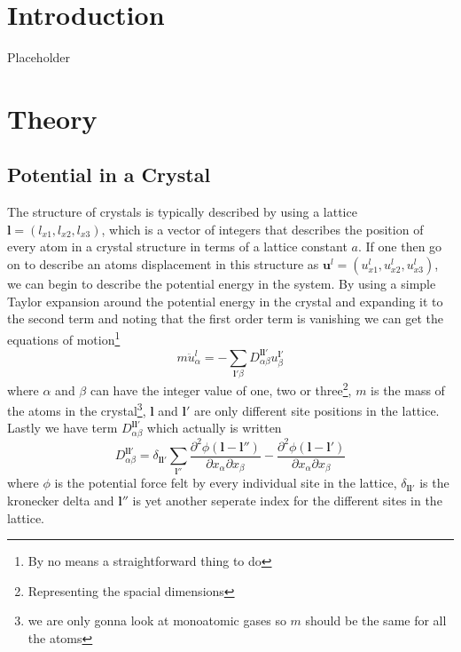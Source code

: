 \documentclass[11pt]{article}
\begin{document}
\section{Introduction}
Placeholder
\section{Theory}
\subsection{Potential in a Crystal}
The structure of crystals is typically described by using a lattice $\mathbf{l} = (l_{x1}, l_{x2}, l_{x3})$, which is a vector of integers that describes the position of every atom in a crystal structure in terms of a lattice constant $a$. If one then go on to describe an atoms displacement in this structure as $\mathbf{u}^l = (u^l_{x1},u^l_{x2},u^l_{x3})$, we can begin to describe the potential energy in the system. By using a simple Taylor expansion around the potential energy in the crystal and expanding it to the second term and noting that the first order term is vanishing we can get the equations of motion\footnote{By no means a straightforward thing to do} 
\begin{equation}
	m \ddot{u}^l_{\alpha} = - \sum_{\mathbf{l}'\beta} D^{\mathbf{l}\mathbf{l}'}_{\alpha \beta} u^{\mathbf{l}'}_{\beta}
	\label{eq:motion}
\end{equation}
where $\alpha$ and $\beta$ can have the integer value of one, two or three\footnote{Representing the spacial dimensions}, $m$ is the mass of the atoms in the crystal\footnote{we are only gonna look at monoatomic gases so $m$ should be the same for all the atoms}, $\mathbf{l}$ and $\mathbf{l}'$ are only different site positions in the lattice. Lastly we have term $D^{\mathbf{l}\mathbf{l}'}_{\alpha \beta}$ which actually is written
\begin{equation}
	D^{\mathbf{l}\mathbf{l}'}_{\alpha \beta} = \delta_{\mathbf{l} \mathbf{l}'} \sum_{\mathbf{l}''} \frac{\partial^2 \phi (\mathbf{l}-\mathbf{l}'')}{\partial x_{\alpha} \partial x_{\beta}}
	-
	\frac{\partial^2 \phi (\mathbf{l}-\mathbf{l}')}{\partial x_{\alpha} \partial x_{\beta}}
\end{equation}
where $\phi$ is the potential force felt by every individual site in the lattice, $\delta_{\mathbf{l}\mathbf{l}'}$ is the kronecker delta and $\mathbf{l}''$ is yet another seperate index for the different sites in the lattice.
\end{document}

